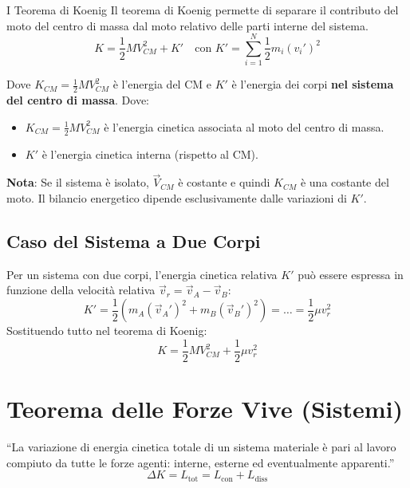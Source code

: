 \begin{teorema}{I Teorema di Koenig}
Il teorema di Koenig permette di separare il contributo del moto del centro di massa dal moto relativo delle parti interne del sistema.
\begin{equation}
    \boxed{K = \frac{1}{2} M V_{CM}^2 + K'} \quad \text{con } K' = \sum_{i=1}^N \frac{1}{2} m_i (v_i')^2
\end{equation}
\end{teorema}
Dove $K_{CM} = \frac{1}{2} M V_{CM}^2$ è l'energia del CM e $K'$ è l'energia dei corpi \textbf{nel sistema del centro di massa}.
Dove:
\begin{itemize}
    \item $K_{CM} = \frac{1}{2} M V_{CM}^2$ è l'energia cinetica associata al moto del centro di massa.
    \item $K'$ è l'energia cinetica interna (rispetto al CM).
\end{itemize}

\textbf{Nota}: Se il sistema è isolato, $\vec{V}_{CM}$ è costante e quindi $K_{CM}$ è una costante del moto. Il bilancio energetico dipende esclusivamente dalle variazioni di $K'$.

\subsection{Caso del Sistema a Due Corpi}
Per un sistema con due corpi, l'energia cinetica relativa $K'$ può essere espressa in funzione della velocità relativa $\vec{v}_r = \vec{v}_A - \vec{v}_B$:
\begin{equation}
    K' = \frac{1}{2} (m_A (\vec{v}_A')^2 + m_B (\vec{v}_B')^2) = \dots = \frac{1}{2} \mu v_r^2
\end{equation}
Sostituendo tutto nel teorema di Koenig:
\begin{equation}
    K = \frac{1}{2} M V_{CM}^2 + \frac{1}{2} \mu v_r^2
\end{equation}

\section{Teorema delle Forze Vive (Sistemi)}
``La variazione di energia cinetica totale di un sistema materiale è pari al lavoro compiuto da tutte le forze agenti: interne, esterne ed eventualmente apparenti.''
\begin{equation}
    \Delta K = L_{\text{tot}} = L_{\text{con}} + L_{\text{diss}}
\end{equation}

